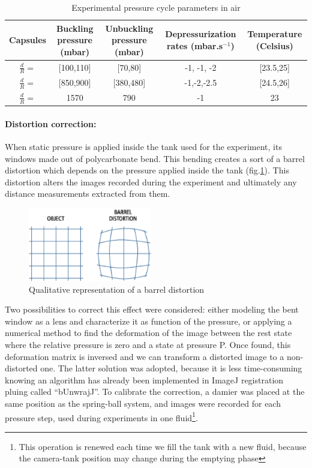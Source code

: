 \begin{table}[H]
	\centering
		\begin{adjustbox}{width=\textwidth}
			\begin{tabular}{|c|c|c|c|c|}
				\hline
				Capsules & Buckling pressure (mbar) & Unbuckling pressure (mbar) & Depressurization rates (mbar.s$^{-1}$) & Temperature (Celsius) \\
				\hline
				$\frac{d}{R} = $ & [100,110]& [70,80] & -1, -1, -2 & [23.5,25]\\
				\hline
				$\frac{d}{R} = $ & [850,900] & [380,480] & -1,-2,-2.5 & [24.5,26]\\
				\hline
				$\frac{d}{R} = $ & 1570 & 790 & -1 & 23 \\
				\hline
			\end{tabular}
		\end{adjustbox}
	\caption{Experimental pressure cycle parameters in air}
	\label{tab:Experimental_pressure_cycle_parameters_in_air}
\end{table}


\paragraph{Distortion correction:}
When static pressure is applied inside the tank used for the experiment, its windows made out of polycarbonate bend. This bending creates a sort of a barrel distortion which depends on the pressure applied inside the tank (fig.\ref{fig:barrel_distortion}). This distortion alters the images recorded during the experiment and ultimately any distance measurements extracted from them.
\begin{figure}[H] %
	\centering%
  \includegraphics[width=0.48\textwidth]{figures/Chapter_1/barrel_effect.png}
	\caption{Qualitative representation of a barrel distortion}
	\label{fig:barrel_distortion}
\end{figure}
 Two possibilities to correct this effect were considered: either modeling the bent window as a lens and characterize it as function of the pressure, or applying a numerical method to find the deformation of the image between the rest state where the relative pressure is zero and a state at pressure P. Once found, this deformation matrix is inversed and we can transform a distorted image to a non-distorted one. The latter solution was adopted, because it is less time-consuming knowing an algorithm has already been implemented in ImageJ registration pluing called "`bUnwrajJ"'.
To calibrate the correction, a damier was placed at the same position as the spring-ball system, and images were recorded for each pressure step, used during experiments in one fluid\footnote{This operation is renewed each time we fill the tank with a new fluid, because the camera-tank position may change during the emptying phase}.




